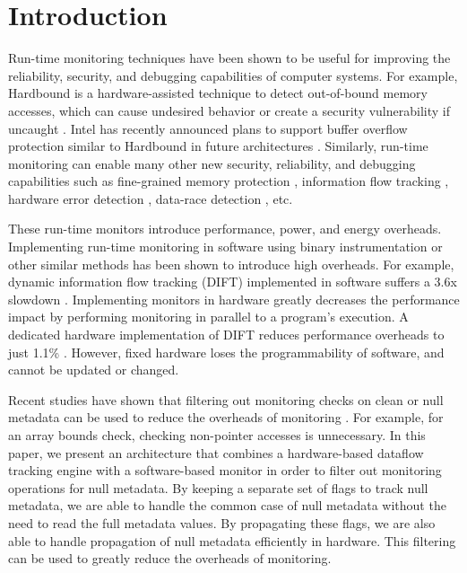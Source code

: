 \section{Introduction}
\label{sec:intro}

Run-time monitoring techniques have been shown to be useful for improving the
reliability, security, and debugging capabilities of computer systems. For
example, Hardbound is a hardware-assisted technique to detect out-of-bound
memory accesses, which can cause undesired behavior or create a security
vulnerability if uncaught \cite{hardbound-asplos08}.  Intel has
recently announced plans to support buffer overflow protection similar to
Hardbound in future architectures \cite{intel-mpx}. Similarly, run-time
monitoring can enable many other new security, reliability, and debugging
capabilities such as fine-grained memory protection \cite{mondrian-asplos02},
information flow tracking \cite{dift-asplos04, testudo-micro08}, hardware error
detection \cite{argus-micro07}, data-race detection \cite{radish-isca12,
cord-hpca06}, etc. 

These run-time monitors introduce performance, power, and energy overheads.
Implementing run-time monitoring in software using binary instrumentation or
other similar methods has been shown to introduce high overheads. For example,
dynamic information flow tracking (DIFT) implemented in software suffers a 3.6x
slowdown \cite{lift-micro06}. Implementing monitors in hardware greatly decreases
the performance impact by performing monitoring in parallel to a program's
execution. A dedicated hardware implementation of DIFT reduces performance
overheads to just 1.1\% \cite{dift-asplos04}. However, fixed hardware loses
the programmability of software, and cannot be updated or changed.

Recent studies have shown that filtering out monitoring checks on clean or null
metadata can be used to reduce the overheads of monitoring \cite{fade-hpca14}. For example, for
an array bounds check, checking non-pointer accesses is unnecessary. In this
paper, we present an architecture that combines a hardware-based dataflow
tracking engine with a software-based monitor in order to filter out monitoring operations 
for null metadata. By keeping a separate set of flags
to track null metadata, we are able to handle the common case of null
metadata without the need to read the full metadata values. By propagating these flags, we
are also able to handle propagation of null metadata efficiently in hardware.
This filtering can be used to greatly reduce the overheads of monitoring.

